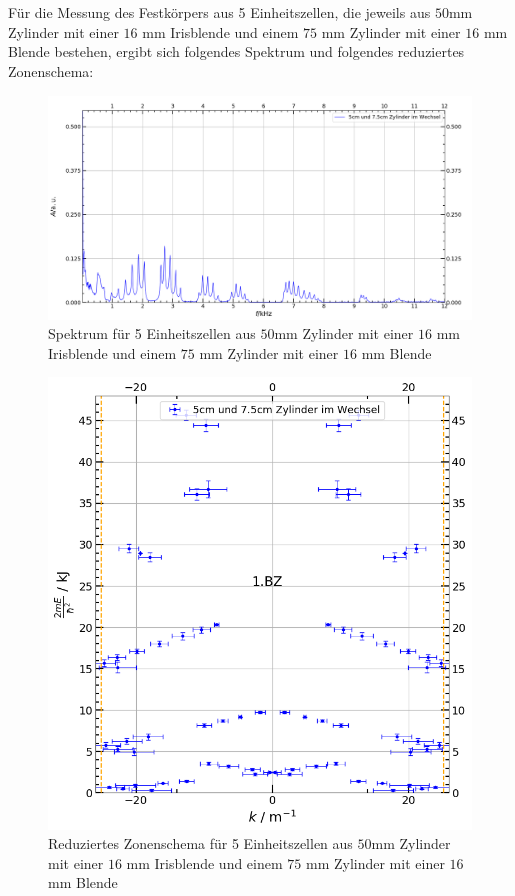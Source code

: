 \documentclass[german,  %
parskip=full,  %
]{scrartcl}
\begin{document}
\\\\
Für die Messung des Festkörpers aus 5 Einheitszellen, die jeweils aus $50$mm Zylinder mit einer $16$ mm Irisblende und einem $75$ mm Zylinder mit einer $16$ mm Blende bestehen, ergibt sich folgendes Spektrum und folgendes reduziertes Zonenschema:
\newpage
\begin{figure}[h!]
\centering
\includegraphics[width=\textwidth]{4632_Uebersichtsspektrum.png}
\caption{Spektrum für 5 Einheitszellen aus $50$mm Zylinder mit einer $16$ mm Irisblende und einem $75$ mm Zylinder mit einer $16$ mm Blende}
\end{figure}
\begin{figure}[h!]
\centering
\includegraphics[scale=0.325]{4632_reduziertes_Zonenschema.png}
\caption{Reduziertes Zonenschema für 5 Einheitszellen aus $50$mm Zylinder mit einer $16$ mm Irisblende und einem $75$ mm Zylinder mit einer $16$ mm Blende}
\end{figure}
\end{document}
